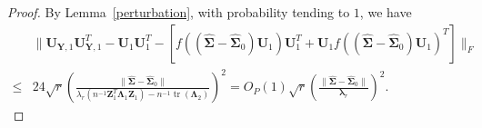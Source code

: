 \documentclass[12pt]{article} %
\DeclareMathOperator{\mytr}{tr}
\newcommand{\bZ}{\mathbf{Z}}
\newcommand{\bY}{\mathbf{Y}}
\newcommand{\bU}{\mathbf{U}}
\newcommand{\bfsym}[1]{\ensuremath{\boldsymbol{#1}}}
\def\blambda {\bfsym {\lambda}}
\def\bLambda {\bfsym {\Lambda}}
\def\bSigma {\bfsym {\Sigma}}
\theoremstyle{definition}
\begin{document}
\begin{appendices}
\begin{proof}
By Lemma~\ref{perturbation}, with probability tending to $1$, we have
    \begin{equation*}
        \begin{split}
            &\|
         \bU_{\bY,1}\bU_{\bY,1}^T
         -\bU_1\bU_1^T
-
            [
                f(
                    (\hat{\bSigma}-\hat{\bSigma}_0) \bU_{1}
                )\bU_{1}^T
                +
                \bU_{1}f(
                    (\hat{\bSigma}-\hat{\bSigma}_0) \bU_{1}
                )^T
            ]
            \|_F
            \\
            \leq &
            24\sqrt{r} \left(\frac{\|\hat{\bSigma}-\hat{\bSigma}_0\|}{\lambda_r\left(n^{-1}\bZ_1^T \bLambda_1\bZ_1  \right)-n^{-1}\mytr(\bLambda_2)}\right)^2
            =O_P(1)\sqrt{r}
\left(\frac{\|\hat{\bSigma}-\hat{\bSigma}_0\|}{\blambda_r}\right)^2
            .
        \end{split}
    \end{equation*}


\end{proof}
\end{appendices}
\end{document}
